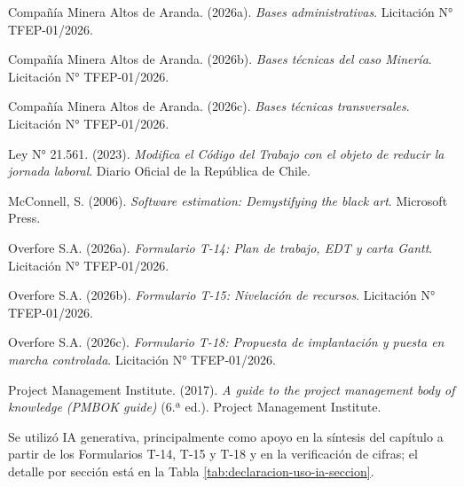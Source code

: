 \documentclass[subdoc]{../../comun/overfore}
\begin{document}
\begin{referencias}
\item Compañía Minera Altos de Aranda. (2026a). \emph{Bases administrativas}. Licitación N° TFEP-01/2026.
\item Compañía Minera Altos de Aranda. (2026b). \emph{Bases técnicas del caso Minería}. Licitación N° TFEP-01/2026.
\item Compañía Minera Altos de Aranda. (2026c). \emph{Bases técnicas transversales}. Licitación N° TFEP-01/2026.
\item Ley N° 21.561. (2023). \emph{Modifica el Código del Trabajo con el objeto de reducir la jornada laboral}. Diario Oficial de la República de Chile.
\item McConnell, S. (2006). \emph{Software estimation: Demystifying the black art}. Microsoft Press.
\item Overfore S.A. (2026a). \emph{Formulario T-14: Plan de trabajo, EDT y carta Gantt}. Licitación N° TFEP-01/2026.
\item Overfore S.A. (2026b). \emph{Formulario T-15: Nivelación de recursos}. Licitación N° TFEP-01/2026.
\item Overfore S.A. (2026c). \emph{Formulario T-18: Propuesta de implantación y puesta en marcha controlada}. Licitación N° TFEP-01/2026.
\item Project Management Institute. (2017). \emph{A guide to the project management body of knowledge (PMBOK guide)} (6.ª ed.). Project Management Institute.
\end{referencias}

Se utilizó IA generativa, principalmente como apoyo en la síntesis del capítulo a partir de los Formularios T-14, T-15 y T-18 y en la verificación de cifras; el detalle por sección está en la Tabla \ref{tab:declaracion-uso-ia-seccion}.
\end{document}
